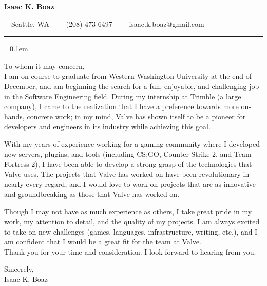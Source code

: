 \documentclass[10pt,letterpaper]{article}
\begin{document}
\begin{center}
    {\LARGE \textbf{Isaac K. Boaz}}

    \ \ Seattle, WA\ \ \textbullet
    \ \ (208) 473-6497\ \ \textbullet
    \ \ isaac.k.boaz@gmail.com
\end{center}

\hrule
\vspace{0.4em}

\parskip=0.1em

\noindent
To whom it may concern, \\
\indent
I am on course to graduate from Western Washington University at the end of
December, and am beginning the search for a fun, enjoyable, and challenging job
in the Software Engineering field. During my internship at Trimble (a large
company), I came to the realization that I have a preference towards more
on-hands, concrete work; in my mind, Valve has shown itself to be a pioneer for
developers and engineers in its industry while achieving this goal.

With my years of experience working for a gaming community where I developed new
servers, plugins, and tools (including CS:GO, Counter-Strike 2, and
Team Fortress 2), I have been able to develop a strong grasp of the technologies
that Valve uses. The projects that Valve has worked on have been revolutionary
in nearly every regard, and I would love to work on projects that are as
innovative and groundbreaking as those that Valve has worked on.

Though I may not have as much experience as others, I take great
pride in my work, my attention to detail, and the quality of my projects. I
am always excited to take on new challenges (games, languages, infrastructure,
writing, etc.), and I am confident that I would be a great fit for the team at
Valve. \\

Thank you for your time and consideration. I look forward to hearing from you.

Sincerely, \\
\indent\indent
Isaac K. Boaz
\end{document}
